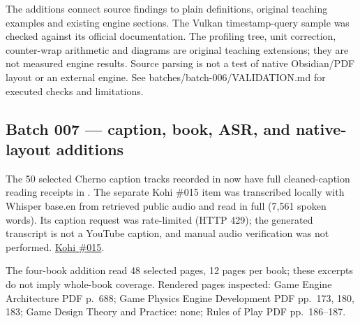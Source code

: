 The additions connect source findings to plain definitions, original teaching examples and existing engine sections. The Vulkan timestamp-query sample was checked against its official documentation. The profiling tree, unit correction, counter-wrap arithmetic and diagrams are original teaching extensions; they are not measured engine results. Source parsing is not a test of native Obsidian/PDF layout or an external engine. See batches/batch-006/VALIDATION.md for executed checks and limitations.

\subsection{Batch 007 --- caption, book, ASR, and native-layout additions}\label{appendix-877738f6f4d2-batch-007-caption-book-asr-and-native-layout-additions}

\hypertarget{appendix-877738f6f4d2-batch-007-caption-book-asr-and-native-layout-additions}{}

The 50 selected Cherno caption tracks recorded in  now have full cleaned-caption reading receipts in . The separate Kohi \#015 item was transcribed locally with Whisper base.en from retrieved public audio and read in full (7,561 spoken words). Its caption request was rate-limited (HTTP 429); the generated transcript is not a YouTube caption, and manual audio verification was not performed. \href{https://www.youtube.com/watch?v=6Kj3O2Ov1RU}{Kohi \#015}.

The four-book addition read 48 selected pages, 12 pages per book; these excerpts do not imply whole-book coverage. Rendered pages inspected: Game Engine Architecture PDF p.~688; Game Physics Engine Development PDF pp.~173, 180, 183; Game Design Theory and Practice: none; Rules of Play PDF pp.~186--187.

